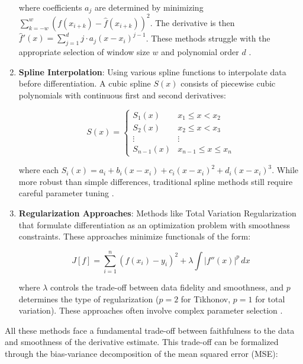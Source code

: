 \documentclass[10pt,journal,compsoc]{IEEEtran}
\begin{document}
\begin{enumerate}
    where coefficients $a_j$ are determined by minimizing $\sum_{k=-w}^{w} \left(f(x_{i+k}) - \hat{f}(x_{i+k})\right)^2$. The derivative is then $\hat{f}'(x) = \sum_{j=1}^{d} j \cdot a_j (x - x_i)^{j-1}$. These methods struggle with the appropriate selection of window size $w$ and polynomial order $d$ \cite{savitzky1964smoothing}.
    
    \item \textbf{Spline Interpolation}: Using various spline functions to interpolate data before differentiation. A cubic spline $S(x)$ consists of piecewise cubic polynomials with continuous first and second derivatives:
    
    \begin{equation}
        S(x) = \begin{cases}
            S_1(x) & x_1 \leq x < x_2 \\
            S_2(x) & x_2 \leq x < x_3 \\
            \vdots & \vdots \\
            S_{n-1}(x) & x_{n-1} \leq x \leq x_n
        \end{cases}
    \end{equation}
    
    where each $S_i(x) = a_i + b_i(x-x_i) + c_i(x-x_i)^2 + d_i(x-x_i)^3$. While more robust than simple differences, traditional spline methods still require careful parameter tuning \cite{ramsay2005functional}.
    
    \item \textbf{Regularization Approaches}: Methods like Total Variation Regularization that formulate differentiation as an optimization problem with smoothness constraints. These approaches minimize functionals of the form:
    
    \begin{equation}
        J[f] = \sum_{i=1}^{n} \left(f(x_i) - y_i\right)^2 + \lambda \int \left|f''(x)\right|^p \, dx
    \end{equation}
    
    where $\lambda$ controls the trade-off between data fidelity and smoothness, and $p$ determines the type of regularization ($p=2$ for Tikhonov, $p=1$ for total variation). These approaches often involve complex parameter selection \cite{chartrand2011numerical}.
\end{enumerate}

All these methods face a fundamental trade-off between faithfulness to the data and smoothness of the derivative estimate. This trade-off can be formalized through the bias-variance decomposition of the mean squared error (MSE):
\end{document}
